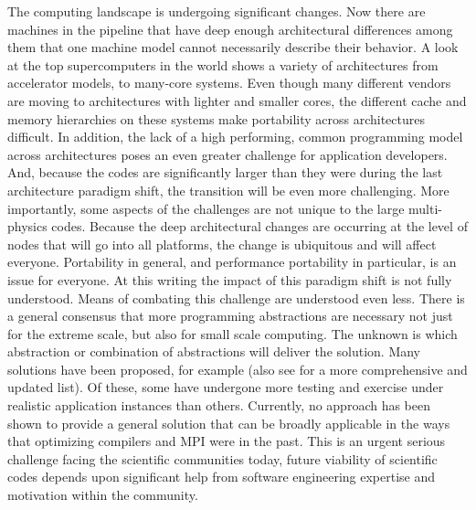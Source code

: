 The computing landscape is undergoing significant changes. Now there are machines
in the pipeline that have deep enough architectural differences among
them that one machine model cannot necessarily describe their behavior.  A look at the top supercomputers in the world shows a variety of architectures from accelerator models, to many-core systems.  Even though many different vendors are moving to architectures with lighter and smaller cores, the different cache and memory hierarchies on these systems make portability across architectures difficult.  In addition, the lack of a high performing, common programming model across architectures poses an even greater challenge for application developers.  And, because
the codes are significantly larger than they were during the last
architecture paradigm shift, the transition will be even more challenging.  More importantly, some aspects of the
challenges are not unique to the large multi-physics codes. Because the
deep architectural changes are occurring at the level of nodes that
will go into all platforms, the change is ubiquitous and will
affect everyone. Portability in general, and performance
portability in particular, is an issue for everyone. At this writing
the impact of this paradigm shift is not fully understood. Means of
combating this challenge are understood even less. There is a general
consensus that more programming abstractions are necessary not just
for the extreme scale, but also for small scale computing. The unknown
is which abstraction or combination of abstractions will deliver the
solution. Many solutions have been proposed, for example \cite{PADAL14} (also
see \cite{IDEAS} for a more comprehensive and updated
list). Of these, some have undergone more testing and exercise under
realistic application instances than others. Currently, no approach has been shown to provide a general solution that can be broadly
applicable in the ways that optimizing compilers and MPI were
in the past. This is an urgent serious challenge facing the scientific
communities today, future viability of scientific codes depends upon
significant help from software engineering expertise and motivation
within the community. 


